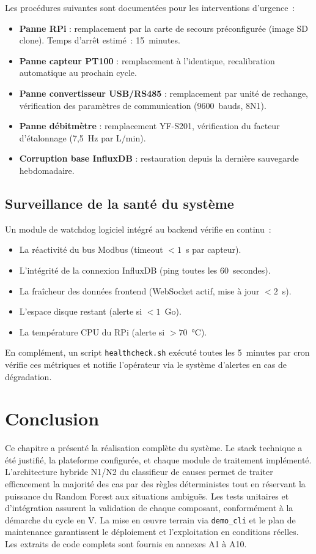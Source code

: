 Les procédures suivantes sont documentées pour les interventions d'urgence~:

\begin{itemize}
  \item \textbf{Panne RPi} : remplacement par la carte de secours préconfigurée (image SD clone). Temps d'arrêt estimé~: 15~minutes.
  \item \textbf{Panne capteur PT100} : remplacement à l'identique, recalibration automatique au prochain cycle.
  \item \textbf{Panne convertisseur USB/RS485} : remplacement par unité de rechange, vérification des paramètres de communication (9600~bauds, 8N1).
  \item \textbf{Panne débitmètre} : remplacement YF-S201, vérification du facteur d'étalonnage (7,5~Hz par L/min).
  \item \textbf{Corruption base InfluxDB} : restauration depuis la dernière sauvegarde hebdomadaire.
\end{itemize}

\subsection{Surveillance de la santé du système}

Un module de watchdog logiciel intégré au backend vérifie en continu~:

\begin{itemize}
  \item La réactivité du bus Modbus (timeout $< 1$~s par capteur).
  \item L'intégrité de la connexion InfluxDB (ping toutes les 60~secondes).
  \item La fraîcheur des données frontend (WebSocket actif, mise à jour $< 2$~s).
  \item L'espace disque restant (alerte si $< 1$~Go).
  \item La température CPU du RPi (alerte si $> 70$~\si{\celsius}).
\end{itemize}

En complément, un script \texttt{healthcheck.sh} exécuté toutes les 5~minutes par cron vérifie ces métriques et notifie l'opérateur via le système d'alertes en cas de dégradation.

\section*{Conclusion}

Ce chapitre a présenté la réalisation complète du système. Le stack technique a été justifié, la plateforme configurée, et chaque module de traitement implémenté. L'architecture hybride N1/N2 du classifieur de causes permet de traiter efficacement la majorité des cas par des règles déterministes tout en réservant la puissance du Random Forest aux situations ambiguës. Les tests unitaires et d'intégration assurent la validation de chaque composant, conformément à la démarche du cycle en V. La mise en œuvre terrain via \texttt{demo\_cli} et le plan de maintenance garantissent le déploiement et l'exploitation en conditions réelles. Les extraits de code complets sont fournis en annexes A1 à A10.
